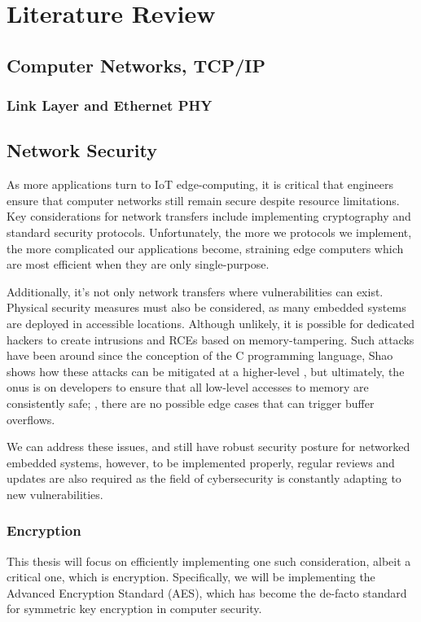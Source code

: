 \chapter[Lit. Review]{Literature Review}
\label{Chap:Lit. Review}
\section{Computer Networks, TCP/IP}

\subsection{Link Layer and Ethernet PHY}

\section{Network Security}
As more applications turn to IoT edge-computing, it is critical that engineers ensure that computer networks still remain secure despite resource limitations. Key considerations for network transfers include implementing cryptography and standard security protocols. Unfortunately, the more we protocols we implement, the more complicated our applications become, straining edge computers which are most efficient when they are only single-purpose.

Additionally, it's not only network transfers where vulnerabilities can exist. Physical security measures must also be considered, as many embedded systems are deployed in accessible locations. Although unlikely, it is possible for dedicated hackers to create intrusions and RCEs based on memory-tampering. Such attacks have been around since the conception of the C programming language, Shao \etal shows how these attacks can be mitigated at a higher-level \cite{Shao2003}, but ultimately, the onus is on developers to ensure that all low-level accesses to memory are consistently safe; \ie, there are no possible edge cases that can trigger buffer overflows.

We can address these issues, and still have robust security posture for networked embedded systems, however, to be implemented properly, regular reviews and updates are also required as the field of cybersecurity is constantly adapting to new vulnerabilities.

\subsection{Encryption}
This thesis will focus on efficiently implementing one such consideration, albeit a critical one, which is encryption. Specifically, we will be implementing the Advanced Encryption Standard (AES), which has become the de-facto standard for symmetric key encryption in computer security.

